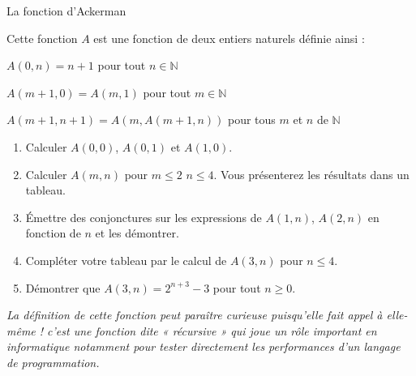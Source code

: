 
\ifdefined\COMPLETE
\else
    
    
\fi

La fonction d'Ackerman 

Cette fonction $A$ est une fonction de deux entiers naturels définie ainsi :

$ A(0,n)= n+1$  pour tout  $n \in  \mathbb{N} $ 

$A(m+1,0)= A(m,1)$ pour tout  $m \in  \mathbb{N} $ 

$A(m+1,n+1)= A(m,A(m+1,n))$  pour tous $m$ et $n$ de $ \mathbb{N} $ 

\begin{enumerate}

\item Calculer $A(0,0)$, $A(0,1)$ et $ A(1,0)$.

\item Calculer $A(m,n)$ pour $m \leqslant 2$  $ n \leqslant 4$. Vous présenterez les résultats dans un tableau.

\item Émettre des conjonctures sur les expressions de $A(1,n)$, $A(2,n)$ en fonction de $n$ et les démontrer.

\item Compléter votre tableau par le calcul de $A(3,n)$ pour $n \leqslant 4$.  

\item Démontrer que $A(3,n)= 2^{n+3}-3$  pour tout $n \geqslant 0$.

\end{enumerate}

{\it La définition de cette fonction peut paraître curieuse puisqu'elle fait appel à elle-même ! 
c'est une fonction dite « récursive » qui joue un rôle important en informatique notamment pour tester directement les performances d'un langage de programmation.}

\ifdefined\COMPLETE
\else
    
\fi
